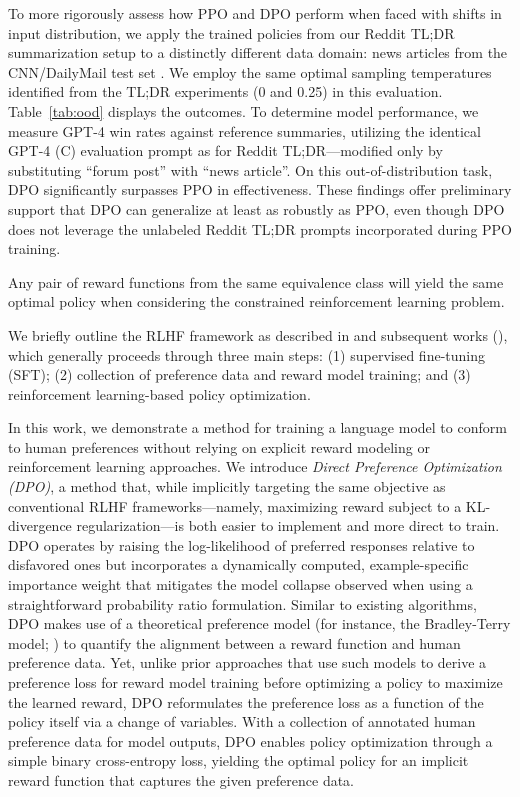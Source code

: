 To more rigorously assess how PPO and DPO perform when faced with shifts in input distribution, we apply the trained policies from our Reddit TL;DR summarization setup to a distinctly different data domain: news articles from the CNN/DailyMail test set \citep{nallapati-etal-2016-abstractive}. We employ the same optimal sampling temperatures identified from the TL;DR experiments (0 and 0.25) in this evaluation. Table~\ref{tab:ood} displays the outcomes. To determine model performance, we measure GPT-4 win rates against reference summaries, utilizing the identical GPT-4 (C) evaluation prompt as for Reddit TL;DR—modified only by substituting ``forum post'' with ``news article''. On this out-of-distribution task, DPO significantly surpasses PPO in effectiveness. These findings offer preliminary support that DPO can generalize at least as robustly as PPO, even though DPO does not leverage the unlabeled Reddit TL;DR prompts incorporated during PPO training.

\begin{lemma}\label{lemma:same_policy}
    Any pair of reward functions from the same equivalence class will yield the same optimal policy when considering the constrained reinforcement learning problem.
\end{lemma}

We briefly outline the RLHF framework as described in \citeauthor{ziegler2020finetuning} and subsequent works (\citep{stiennon2022learning, bai2022training, ouyang2022training}), which generally proceeds through three main steps: (1) supervised fine-tuning (SFT); (2) collection of preference data and reward model training; and (3) reinforcement learning-based policy optimization.

In this work, we demonstrate a method for training a language model to conform to human preferences without relying on explicit reward modeling or reinforcement learning approaches. We introduce \textit{Direct Preference Optimization (DPO)}, a method that, while implicitly targeting the same objective as conventional RLHF frameworks—namely, maximizing reward subject to a KL-divergence regularization—is both easier to implement and more direct to train. DPO operates by raising the log-likelihood of preferred responses relative to disfavored ones but incorporates a dynamically computed, example-specific importance weight that mitigates the model collapse observed when using a straightforward probability ratio formulation. Similar to existing algorithms, DPO makes use of a theoretical preference model (for instance, the Bradley-Terry model; \cite{bradley1952rankanalysis}) to quantify the alignment between a reward function and human preference data. Yet, unlike prior approaches that use such models to derive a preference loss for reward model training before optimizing a policy to maximize the learned reward, DPO reformulates the preference loss as a function of the policy itself via a change of variables. With a collection of annotated human preference data for model outputs, DPO enables policy optimization through a simple binary cross-entropy loss, yielding the optimal policy for an implicit reward function that captures the given preference data.

